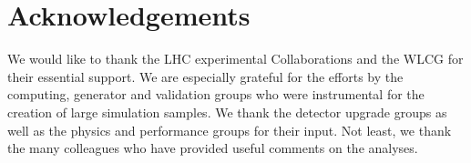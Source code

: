 \documentclass[11pt,twoside,a4paper]{cernrep}
\begin{document}
\section*{Acknowledgements}
We would like to thank the LHC experimental Collaborations and the WLCG for their essential support.
We are especially grateful for the efforts by the computing, generator and validation groups who were
instrumental for the creation of large simulation samples. We thank the detector upgrade groups as well
as the physics and performance groups for their input.  Not least, we thank the many colleagues who
have provided useful comments on the analyses.



\end{document}
